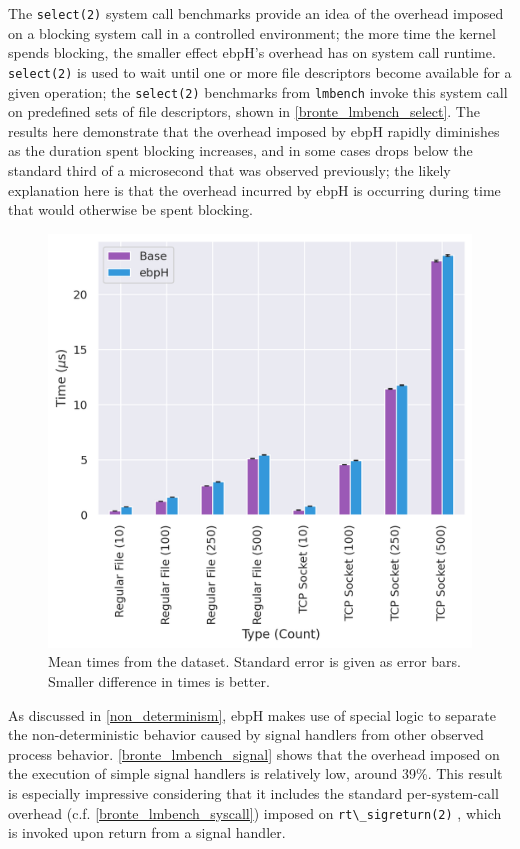 \documentclass[
  12pt]{findlay}
\newcommand{\passthrough}[1]{#1}
\begin{document}
The \passthrough{\lstinline!select(2)!} system call benchmarks provide
an idea of the overhead imposed on a blocking system call in a
controlled environment; the more time the kernel spends blocking, the
smaller effect ebpH's overhead has on system call runtime.
\passthrough{\lstinline!select(2)!} \autocite{man_select} is used to
wait until one or more file descriptors become available for a given
operation; the \passthrough{\lstinline!select(2)!} benchmarks from
\passthrough{\lstinline!lmbench!} invoke this system call on predefined
sets of file descriptors, shown in \autoref{bronte_lmbench_select}. The
results here demonstrate that the overhead imposed by ebpH rapidly
diminishes as the duration spent blocking increases, and in some cases
drops below the standard third of a microsecond that was observed
previously; the likely explanation here is that the overhead incurred by
ebpH is occurring during time that would otherwise be spent blocking.

\begin{figure}
    \caption[Mean  times from the  dataset]{
        Mean  times from the  dataset.
        Standard error is given as error bars.
        Smaller difference in times is better.
    }
    \label{bronte_lmbench_select_graph}
    \includegraphics[width=.6\textwidth]{../data/bench/bronte-lmbench/select_times.png}
\end{figure}

\FloatBarrier

As discussed in \autoref{non_determinism}, ebpH makes use of special
logic to separate the non-deterministic behavior caused by signal
handlers from other observed process behavior.
\autoref{bronte_lmbench_signal} shows that the overhead imposed on the
execution of simple signal handlers is relatively low, around 39\%. This
result is especially impressive considering that it includes the
standard per-system-call overhead (c.f.
\autoref{bronte_lmbench_syscall}) imposed on
\passthrough{\lstinline!rt\_sigreturn(2)!} \autocite{man_sigreturn},
which is invoked upon return from a signal handler.
\end{document}
